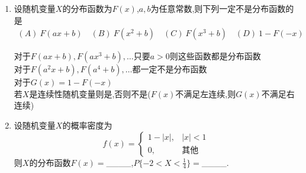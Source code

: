 \documentclass[12pt, a4paper, oneside, UTF8]{ctexbook}
\begin{document}
\begin{enumerate}[label=\arabic*.]
    \item 设随机变量$X$的分布函数为$F(x)$,$a,b$为任意常数,则下列一定不是分布函数的是
    \begin{align*}
        (A)\ F(ax+b) \quad (B)\ F(x^2+b) \quad (C)\ F(x^3+b) \quad (D)\ 1-F(-x)
    \end{align*}
    
    \begin{tcolorbox}[title=总结]
        对于$F(ax+b),F(ax^3+b),\ldots$只要$a>0$则这些函数都是分布函数 \\
        对于$F(a^2x+b),F(a^4+b),\ldots$都一定不是分布函数 \\
        对于$G(x)=1-F(-x)$ 
        \\若$X$是连续性随机变量则是,否则不是($F(x)$不满足左连续,则$G(x)$不满足右连续)
    \end{tcolorbox}
    
    \item 设随机变量$X$的概率密度为
    \[
        f(x)=
        \begin{cases}
            1-|x|, & |x|<1 \\
            0, & \text{其他}
        \end{cases}
    \]
    则$X$的分布函数$F(x)=$\_\_\_\_,$P\{-2<X<\frac{1}{4}\}=$\_\_\_\_.
    

\end{enumerate}
\end{document}
